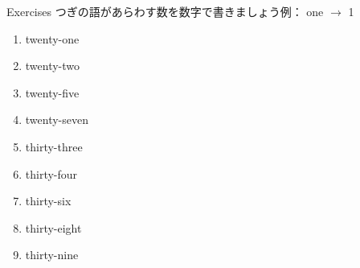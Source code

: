 \documentclass[aspectratio=169,xcolor={dvipsnames,table}]{beamer}
\begin{document}
\begin{frame}[plain]{Exercises}
 つぎの語があらわす数を数字で書きましょう\hspace{20pt}例： one $\rightarrow$ 1
\begin{enumerate}
 \item twenty-one\hfill{}\hspace{250pt}\mbox{}
 \item twenty-two\hfill{}\hspace{250pt}\mbox{}
 \item twenty-five\hfill{}\hspace{250pt}\mbox{}
 \item twenty-seven\hfill{}\hspace{250pt}\mbox{}
 \item thirty-three\hfill{}\hspace{250pt}\mbox{}
 \item thirty-four\hfill{}\hspace{250pt}\mbox{}
 \item thirty-six\hfill{}\hspace{250pt}\mbox{}
 \item thirty-eight\hfill{}\hspace{250pt}\mbox{}
 \item thirty-nine\hfill{}\hspace{250pt}\mbox{}
\end{enumerate}
\end{frame}
\end{document}
